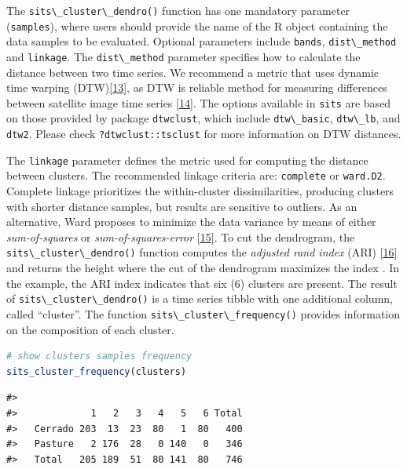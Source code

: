 \documentclass[
  11pt,
]{report}
\newcommand{\passthrough}[1]{#1}
\begin{document}
The \passthrough{\lstinline!sits\_cluster\_dendro()!} function has one
mandatory parameter (\passthrough{\lstinline!samples!}), where users
should provide the name of the R object containing the data samples to
be evaluated. Optional parameters include
\passthrough{\lstinline!bands!}, \passthrough{\lstinline!dist\_method!}
and \passthrough{\lstinline!linkage!}. The
\passthrough{\lstinline!dist\_method!} parameter specifies how to
calculate the distance between two time series. We recommend a metric
that uses dynamic time warping
(DTW)\protect\hyperlink{ref-Petitjean2012}{{[}13{]}}, as DTW is reliable
method for measuring differences between satellite image time series
\protect\hyperlink{ref-Maus2016}{{[}14{]}}. The options available in
\passthrough{\lstinline!sits!} are based on those provided by package
\passthrough{\lstinline!dtwclust!}, which include
\passthrough{\lstinline!dtw\_basic!}, \passthrough{\lstinline!dtw\_lb!},
and \passthrough{\lstinline!dtw2!}. Please check
\passthrough{\lstinline!?dtwclust::tsclust!} for more information on DTW
distances.

The \passthrough{\lstinline!linkage!} parameter defines the metric used
for computing the distance between clusters. The recommended linkage
criteria are: \passthrough{\lstinline!complete!} or
\passthrough{\lstinline!ward.D2!}. Complete linkage prioritizes the
within-cluster dissimilarities, producing clusters with shorter distance
samples, but results are sensitive to outliers. As an alternative, Ward
proposes to minimize the data variance by means of either
\emph{sum-of-squares} or \emph{sum-of-squares-error}
\protect\hyperlink{ref-Ward1963}{{[}15{]}}. To cut the dendrogram, the
\passthrough{\lstinline!sits\_cluster\_dendro()!} function computes the
\emph{adjusted rand index} (ARI)
\protect\hyperlink{ref-Rand1971}{{[}16{]}} and returns the height where
the cut of the dendrogram maximizes the index . In the example, the ARI
index indicates that six (6) clusters are present. The result of
\passthrough{\lstinline!sits\_cluster\_dendro()!} is a time series
tibble with one additional column, called ``cluster''. The function
\passthrough{\lstinline!sits\_cluster\_frequency()!} provides
information on the composition of each cluster.

\begin{lstlisting}[language=R]
# show clusters samples frequency
sits_cluster_frequency(clusters)
\end{lstlisting}

\begin{lstlisting}
#>          
#>             1   2   3   4   5   6 Total
#>   Cerrado 203  13  23  80   1  80   400
#>   Pasture   2 176  28   0 140   0   346
#>   Total   205 189  51  80 141  80   746
\end{lstlisting}
\end{document}
